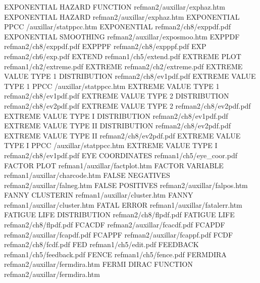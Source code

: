 EXPONENTIAL HAZARD FUNCTION             refman2/auxillar/exphaz.htm
EXPONENTIAL HAZARD                      refman2/auxillar/exphaz.htm
EXPONENTIAL PPCC                        /auxillar/statppcc.htm
EXPONENTIAL                             refman2/ch8/exppdf.pdf
EXPONENTIAL SMOOTHING                   refman2/auxillar/exposmoo.htm
EXPPDF                                  refman2/ch8/exppdf.pdf
EXPPPF                                  refman2/ch8/expppf.pdf
EXP                                     refman2/ch6/exp.pdf
EXTEND                                  refman1/ch5/extend.pdf
EXTREME PLOT                            refman1/ch2/extreme.pdf
EXTREME                                 refman2/ch2/extreme.pdf
EXTREME VALUE TYPE 1 DISTRIBUTION       refman2/ch8/ev1pdf.pdf
EXTREME VALUE TYPE 1 PPCC               /auxillar/statppcc.htm
EXTREME VALUE TYPE 1                    refman2/ch8/ev1pdf.pdf
EXTREME VALUE TYPE 2 DISTRIBUTION       refman2/ch8/ev2pdf.pdf
EXTREME VALUE TYPE 2                    refman2/ch8/ev2pdf.pdf
EXTREME VALUE TYPE I DISTRIBUTION       refman2/ch8/ev1pdf.pdf
EXTREME VALUE TYPE II DISTRIBUTION      refman2/ch8/ev2pdf.pdf
EXTREME VALUE TYPE II                   refman2/ch8/ev2pdf.pdf
EXTREME VALUE TYPE I PPCC               /auxillar/statppcc.htm
EXTREME VALUE TYPE I                    refman2/ch8/ev1pdf.pdf
EYE COORDINATES                         refman1/ch5/eye_coor.pdf
FACTOR PLOT                             refman1/auxillar/factplot.htm
FACTOR VARIABLE                         refman1/auxillar/charcode.htm
FALSE NEGATIVES                         refman2/auxillar/falneg.htm
FALSE POSITIVES                         refman2/auxillar/falpos.htm
FANNY CLUSTERIN                         refman1/auxillar/cluster.htm
FANNY                                   refman1/auxillar/cluster.htm
FATAL ERROR                             refman1/auxillar/fatalerr.htm
FATIGUE LIFE DISTRIBUTION               refman2/ch8/flpdf.pdf
FATIGUE LIFE                            refman2/ch8/flpdf.pdf
FCACDF                                  refman2/auxillar/fcacdf.pdf
FCAPDF                                  refman2/auxillar/fcapdf.pdf
FCAPPF                                  refman2/auxillar/fcappf.pdf
FCDF                                    refman2/ch8/fcdf.pdf
FED                                     refman1/ch5/edit.pdf
FEEDBACK                                refman1/ch5/feedback.pdf
FENCE                                   refman1/ch5/fence.pdf
FERMDIRA                                refman2/auxillar/fermdira.htm
FERMI DIRAC FUNCTION                    refman2/auxillar/fermdira.htm
